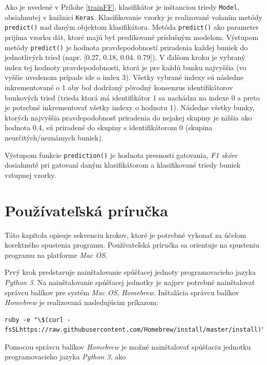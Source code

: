 Ako je uvedené v Prílohe \ref{trainFF}, klasifikátor je inštanciou triedy \texttt{Model}, obsiahnutej v knižnici \texttt{Keras}. Klasifikovanie vzorky je realizované volaním metódy \texttt{predict()} nad daným objektom klasifikátora. Metóda \texttt{predict()} ako parameter prijíma vzorku dát, ktoré majú byť predikované príslušným modelom. Výstupom metódy \texttt{predict()} je hodnota pravdepodobností priradenia každej buniek do jednotlivých tried (napr. [0.27, 0.18, 0.04. 0.79]). V ďalšom kroku je vybraný index tej hodnoty pravdepodobnosti, ktorá je pre každú bunku najvyššia (vo vyššie uvedenom prípade ide o index 3). Všetky vybrané indexy sú následne inkrementované o 1 aby bol dodržaný pôvodný konsenzus identifikátorov bunkových tried (trieda ktorá má identifikátor 1 sa nachádza na indexe 0 a preto je potrebné inkrementovať všetky indexy o hodnotu 1). Následne všetky bunky, ktorých najvyššia pravdepodobnosť priradenia do nejakej skupiny je nižšia ako hodnota 0.4, sú priradené do skupiny s identifikátorom 0 (skupina neurčitých/neznámych buniek).

Výstupom funkcie \texttt{prediction()} je hodnota presnosti gatovania, \textit{F1 skóre} dosiahnuté pri gatovaní daným klasifikátorom a klasifikované triedy buniek vstupnej vzorky.

\chapter{Používateľská príručka}

Táto kapitola opisuje sekvenciu krokov, ktoré je potrebné vykonať za účelom korektného spustenia programu. Používateľská príručka sa orientuje na spusteniu programu na platforme \textit{Mac OS}.

Prvý krok predstavuje nainštalovanie spúšťacej jednoty programovacieho jazyka \textit{Python 3}. Na nainštalovanie spúšťacej jednotky je najprv potrebné nainštalovať správcu balíkov pre systém \textit{Mac OS}, \textit{Homebrew}. Inštalácia správcu balíkov \textit{Homebrew} je realizovaná nasledujúcim príkazom:

\begin{Verbatim}[breaklines=true, breakanywhere=true]
ruby -e "\$(curl -fsSLhttps://raw.githubusercontent.com/Homebrew/install/master/install)"
\end{Verbatim}

Pomocou správcu balíkov \textit{Homebrew} je možné nainštalovať spúšťaciu jednotku programovacieho jazyka \textit{Python 3}, ako

